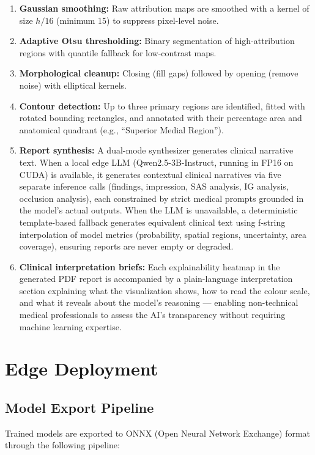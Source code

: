 \documentclass[12pt,a4paper]{report}
\begin{document}
\begin{enumerate}
    \item \textbf{Gaussian smoothing:} Raw attribution maps are smoothed with a kernel of size $h/16$ (minimum 15) to suppress pixel-level noise.
    \item \textbf{Adaptive Otsu thresholding:} Binary segmentation of high-attribution regions with quantile fallback for low-contrast maps.
    \item \textbf{Morphological cleanup:} Closing (fill gaps) followed by opening (remove noise) with elliptical kernels.
    \item \textbf{Contour detection:} Up to three primary regions are identified, fitted with rotated bounding rectangles, and annotated with their percentage area and anatomical quadrant (e.g., ``Superior Medial Region'').
    \item \textbf{Report synthesis:} A dual-mode synthesizer generates clinical narrative text. When a local edge LLM (Qwen2.5-3B-Instruct, running in FP16 on CUDA) is available, it generates contextual clinical narratives via five separate inference calls (findings, impression, SAS analysis, IG analysis, occlusion analysis), each constrained by strict medical prompts grounded in the model's actual outputs. When the LLM is unavailable, a deterministic template-based fallback generates equivalent clinical text using f-string interpolation of model metrics (probability, spatial regions, uncertainty, area coverage), ensuring reports are never empty or degraded.
    \item \textbf{Clinical interpretation briefs:} Each explainability heatmap in the generated PDF report is accompanied by a plain-language interpretation section explaining what the visualization shows, how to read the colour scale, and what it reveals about the model's reasoning --- enabling non-technical medical professionals to assess the AI's transparency without requiring machine learning expertise.
\end{enumerate}

\section{Edge Deployment}

\subsection{Model Export Pipeline}

Trained models are exported to ONNX (Open Neural Network Exchange) format through the following pipeline:
\end{document}
